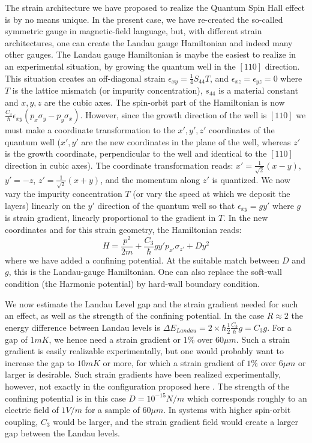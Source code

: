 \documentclass[prl,aps,amssymb,shownopacs,twocolumn]{revtex4}
\begin{document}
The strain architecture we have proposed to realize the Quantum Spin
Hall effect is by no means unique. In the present case, we have
re-created the so-called symmetric gauge in magnetic-field language,
but, with different strain architectures, one can create the Landau
gauge Hamiltonian and indeed many other gauges. The Landau gauge
Hamiltonian is maybe the easiest to realize in an experimental
situation, by growing the quantum well in the $[110]$ direction.
This situation creates an off-diagonal strain $\epsilon_{xy}  =
\frac{1}{4} S_{44} T$, and $\epsilon_{xz} = \epsilon_{yz} =0$ where
$T$ is the lattice mismatch (or impurity concentration), $s_{44}$ is
a material constant and $x,y,z$ are the cubic axes. The spin-orbit
part of the Hamiltonian is now $\frac{C_3}{\hbar} \epsilon_{xy} (p_x
\sigma_y - p_y \sigma_x)$. However, since the growth direction of
the well is $[110]$ we must make a coordinate transformation to the
$x',y',z'$ coordinates of the quantum well ($x', y'$ are the new
coordinates in the plane of the well, whereas $z'$ is the growth
coordinate, perpendicular to the well and identical to the $[110]$
direction in cubic axes). The coordinate transformation reads: $x'
=\frac{1}{\sqrt{2} }(x-y)$, $y' = -z$, $z' = \frac{1}{\sqrt{2}}
(x+y)$, and the momentum along $z'$ is quantized. We now vary the
impurity concentration $T$ (or vary the speed at which we deposit
the layers) linearly on the $y'$ direction of the quantum well so
that $\epsilon_{xy}= g y'$ where $g$ is strain gradient, linearly
proportional to the gradient in $T$. In the new coordinates and for
this strain geometry, the Hamiltonian reads:
\begin{equation}
H = \frac{p^2}{2m} + \frac{C_3}{\hbar} g y' p_{x'} \sigma_{z'} + D
y^2
\end{equation}
\noindent where we have added a confining potential. At the
suitable match between $D$ and $g$, this is the Landau-gauge
Hamiltonian. One can also replace the soft-wall condition (the
Harmonic potential) by hard-wall boundary condition.

We now estimate the Landau Level gap and the strain gradient
needed for such an effect, as well as the strength of the
confining potential. In the case $R \approx 2$ the energy
difference between Landau levels is $\Delta E_{Landau} = 2 \times
\hbar \frac{1}{2} \frac{C_3}{\hbar} g = C_3 g$. For a gap of
$1mK$, we hence need a strain gradient or $1 \%$ over $60 \mu m$.
Such a strain gradient is easily realizable experimentally, but
one would probably want to increase the gap to $10mK$ or more, for
which a strain gradient of $1 \%$ over $6 \mu m$ or larger is
desirable. Such strain gradients have been realized
experimentally, however, not exactly in the configuration proposed
here \cite{shen1996,shen1997}. The strength of the confining
potential is in this case $D = 10^{-15} N/m$ which corresponds
roughly to an electric field of $1 V/m$ for a sample of $60 \mu
m$. In systems with higher spin-orbit coupling, $C_3$ would be
larger, and the strain gradient field would create a larger gap
between the Landau levels.
\end{document}
